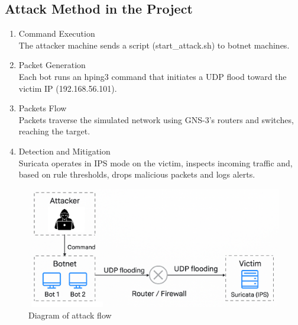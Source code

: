\subsection{Attack Method in the Project}
\begin{enumerate}
    \item Command Execution
    \\ The attacker machine sends a script (start\_attack.sh) to botnet machines.
    \item Packet Generation
    \\ Each bot runs an hping3 command that initiates a UDP flood toward the victim IP (192.168.56.101).
    \item Packets Flow
    \\ Packets traverse the simulated network using GNS-3's routers and switches, reaching the target.
    \item Detection and Mitigation
    \\ Suricata operates in IPS mode on the victim, inspects incoming traffic and, based on rule thresholds, drops malicious packets and logs alerts.
\end{enumerate}
\begin{figure}[!htb]
    \centering
    \includegraphics[width=0.8\linewidth]{thesis/attackDiagram.png}
    \caption{Diagram of attack flow}
    \label{fig:enter-label}
\end{figure}
